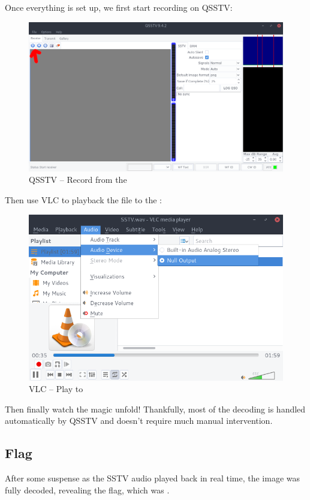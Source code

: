 		\pagebreak
		Once everything is set up, we first start recording on QSSTV:

		\begin{figure}[!htbp]
			\centering
			\includegraphics[width=120mm]{figures/sstv/record.png} \vspace{5mm}
			\caption{QSSTV -- Record from the }
		\end{figure}

		Then use VLC to playback the  file to the :

		\begin{figure}[!htbp]
			\centering
			\includegraphics[width=120mm]{figures/sstv/vlc.png} \vspace{5mm}
			\caption{VLC -- Play to }
		\end{figure}

		Then finally watch the magic unfold! Thankfully, most of the decoding is handled automatically by QSSTV and
		doesn't require much manual intervention.


	\pagebreak
	\subsection{Flag}
		After some suspense as the SSTV audio played back in real time, the image was fully decoded, revealing the flag, which
		was .

